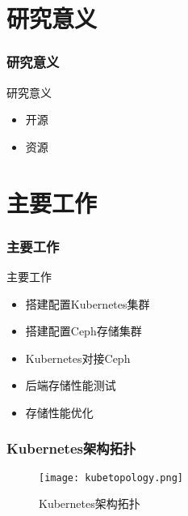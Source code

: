 \documentclass[14pt, AutoFakeBold]{ldr}
\begin{document}
\section{研究意义}
\begin{frame}
  \frametitle{研究意义}
  研究意义
  \begin{itemize}
    \item 开源
    \item 资源
  \end{itemize}
\end{frame}

\section{主要工作}
\begin{frame}
  \frametitle{主要工作}
  主要工作
  \begin{itemize}
    \item 搭建配置Kubernetes集群
    \item 搭建配置Ceph存储集群
    \item Kubernetes对接Ceph
    \item 后端存储性能测试
    \item 存储性能优化
  \end{itemize}
\end{frame}

\begin{frame}
  \frametitle{Kubernetes架构拓扑}
  \begin{figure}[H]
    \centering
    \texttt{[image: kubetopology.png]}
  
    \caption{Kubernetes架构拓扑}
    \label{kubetopology}
  \end{figure}
\end{frame}
\end{document}
